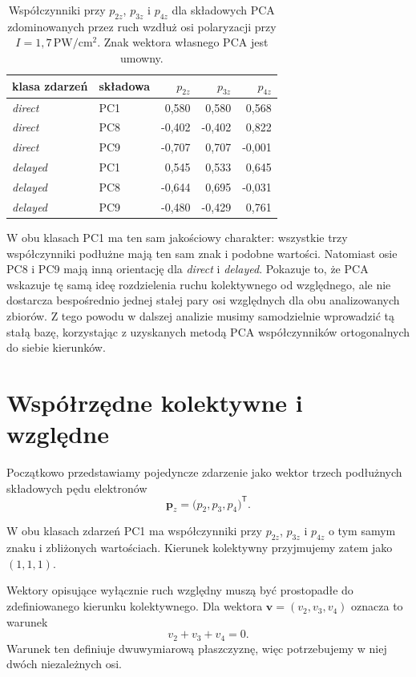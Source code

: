 \documentclass[12pt,letterpaper,oneside]{report}
\numberwithin{equation}{chapter}
\numberwithin{figure}{chapter}
\numberwithin{table}{chapter}
\newcommand{\direct}{\textit{direct}}
\newcommand{\delayed}{\textit{delayed}}
\begin{document}
\begin{table}[htbp]
\centering
\caption{Współczynniki przy $p_{2z}$, $p_{3z}$ i $p_{4z}$ dla składowych PCA zdominowanych przez ruch wzdłuż osi polaryzacji przy $I=1{,}7\,\mathrm{PW/cm^2}$. Znak wektora własnego PCA jest umowny.}
\label{tab:pca-z}
\begin{tabular}{llrrr}
\toprule
klasa zdarzeń & składowa & $p_{2z}$ & $p_{3z}$ & $p_{4z}$\\
\midrule
\direct  & PC1 &  0,580 &  0,580 &  0,568\\
\direct  & PC8 & -0,402 & -0,402 &  0,822\\
\direct  & PC9 & -0,707 &  0,707 & -0,001\\
\delayed & PC1 &  0,545 &  0,533 &  0,645\\
\delayed & PC8 & -0,644 &  0,695 & -0,031\\
\delayed & PC9 & -0,480 & -0,429 &  0,761\\
\bottomrule
\end{tabular}
\end{table}

W obu klasach PC1 ma ten sam jakościowy charakter: wszystkie trzy współczynniki podłużne mają ten sam znak i podobne wartości. Natomiast osie PC8 i PC9 mają inną orientację dla \direct{} i \delayed{}. Pokazuje to, że PCA wskazuje tę samą ideę rozdzielenia ruchu kolektywnego od względnego, ale nie dostarcza bespośrednio jednej stałej pary osi względnych dla obu analizowanych zbiorów. Z tego powodu w dalszej analizie musimy samodzielnie wprowadzić tą stałą bazę, korzystając z uzyskanych metodą PCA współczynników ortogonalnych do siebie kierunków.

\section{Współrzędne kolektywne i względne}

Początkowo przedstawiamy pojedyncze zdarzenie jako wektor trzech podłużnych składowych pędu elektronów
\begin{equation}
\mathbf{p}_z=
\bigl(p_2,p_3,p_4\bigr)^{\mathsf T}.
\label{eq:5}
\end{equation}

W obu klasach zdarzeń PC1 ma współczynniki przy $p_{2z}$, $p_{3z}$ i
$p_{4z}$ o tym samym znaku i zbliżonych wartościach. Kierunek
kolektywny przyjmujemy zatem jako $(1,1,1)$.

Wektory opisujące wyłącznie ruch względny muszą być prostopadłe do zdefiniowanego kierunku kolektywnego. Dla wektora $\mathbf v=(v_2,v_3,v_4)$ oznacza to warunek
\begin{equation}
v_2+v_3+v_4=0.
\label{eq:relative-plane}
\end{equation}
Warunek ten definiuje dwuwymiarową płaszczyznę, więc potrzebujemy w niej dwóch niezależnych osi.
\end{document}
